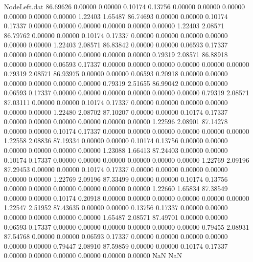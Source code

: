 \begin{filecontents}{NodeLeft.dat}
  86.69626    0.00000    0.00000     0.10174    0.13756    0.00000    0.00000    0.00000    0.00000    0.00000    0.00000    1.22403    1.65487
  86.74693    0.00000    0.00000     0.10174    0.17337    0.00000    0.00000    0.00000    0.00000    0.00000    0.00000    1.22403    2.08571
  86.79762    0.00000    0.00000     0.10174    0.17337    0.00000    0.00000    0.00000    0.00000    0.00000    0.00000    1.22403    2.08571
  86.83842    0.00000    0.00000     0.06593    0.17337    0.00000    0.00000    0.00000    0.00000    0.00000    0.00000    0.79319    2.08571
  86.88918    0.00000    0.00000     0.06593    0.17337    0.00000    0.00000    0.00000    0.00000    0.00000    0.00000    0.79319    2.08571
  86.93975    0.00000    0.00000     0.06593    0.20918    0.00000    0.00000    0.00000    0.00000    0.00000    0.00000    0.79319    2.51655
  86.99042    0.00000    0.00000     0.06593    0.17337    0.00000    0.00000    0.00000    0.00000    0.00000    0.00000    0.79319    2.08571
  87.03111    0.00000    0.00000     0.10174    0.17337    0.00000    0.00000    0.00000    0.00000    0.00000    0.00000    1.22480    2.08702
  87.10207    0.00000    0.00000     0.10174    0.17337    0.00000    0.00000    0.00000    0.00000    0.00000    0.00000    1.22596    2.08901
  87.14278    0.00000    0.00000     0.10174    0.17337    0.00000    0.00000    0.00000    0.00000    0.00000    0.00000    1.22558    2.08836
  87.19334    0.00000    0.00000     0.10174    0.13756    0.00000    0.00000    0.00000    0.00000    0.00000    0.00000    1.23088    1.66413
  87.24403    0.00000    0.00000     0.10174    0.17337    0.00000    0.00000    0.00000    0.00000    0.00000    0.00000    1.22769    2.09196
  87.29453    0.00000    0.00000     0.10174    0.17337    0.00000    0.00000    0.00000    0.00000    0.00000    0.00000    1.22769    2.09196
  87.33499    0.00000    0.00000     0.10174    0.13756    0.00000    0.00000    0.00000    0.00000    0.00000    0.00000    1.22660    1.65834
  87.38549    0.00000    0.00000     0.10174    0.20918    0.00000    0.00000    0.00000    0.00000    0.00000    0.00000    1.22547    2.51952
  87.43635    0.00000    0.00000     0.13756    0.17337    0.00000    0.00000    0.00000    0.00000    0.00000    0.00000    1.65487    2.08571
  87.49701    0.00000    0.00000     0.06593    0.17337    0.00000    0.00000    0.00000    0.00000    0.00000    0.00000    0.79455    2.08931
  87.54768    0.00000    0.00000     0.06593    0.17337    0.00000    0.00000    0.00000    0.00000    0.00000    0.00000    0.79447    2.08910
  87.59859    0.00000    0.00000     0.10174    0.17337    0.00000    0.00000    0.00000    0.00000    0.00000    0.00000        NaN        NaN
\end{filecontents}
